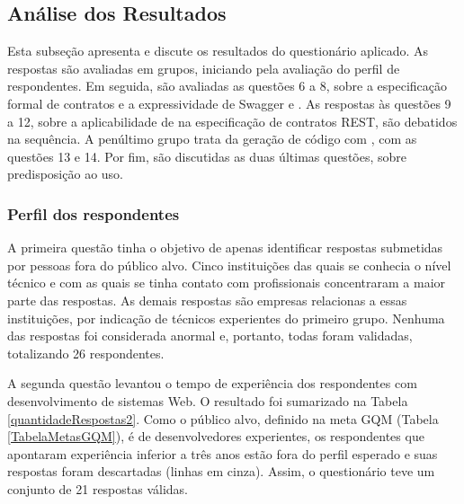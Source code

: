 \subsection{Análise dos Resultados}
\label{AnaliseQuestionario}
\vspace{-6mm}

Esta subseção apresenta e discute os resultados do questionário aplicado. As
respostas são avaliadas em grupos, iniciando pela avaliação do perfil de
respondentes. Em seguida, são avaliadas as questões 6 a 8, sobre a especificação
formal de contratos e a expressividade de Swagger e \neoidl{}. As respostas às
questões 9 a 12, sobre a aplicabilidade de \designbycontract{} na especificação
 de contratos REST, são debatidos na sequência. A penúltimo grupo trata da
 geração de código com \designbycontract{}, com as questões 13 e 14. Por fim,
 são discutidas as duas últimas questões, sobre predisposição ao uso.

\subsubsection{Perfil dos respondentes}

A primeira questão tinha o objetivo de apenas identificar respostas
submetidas por pessoas fora do público alvo. Cinco instituições das quais se
conhecia o nível técnico e com as quais se tinha contato com profissionais
concentraram a maior parte das respostas. As demais respostas são empresas
relacionas a essas instituições, por indicação de técnicos experientes
do primeiro grupo. Nenhuma das respostas foi considerada anormal e, portanto,
todas foram validadas, totalizando 26 respondentes.

A segunda questão levantou o tempo de experiência dos respondentes com
desenvolvimento de sistemas Web. O resultado foi sumarizado na Tabela
\ref{quantidadeRespostas2}. Como o público alvo, definido na meta GQM (Tabela
\ref{TabelaMetasGQM}), é de desenvolvedores experientes, os respondentes que
apontaram experiência inferior a três anos estão fora do perfil esperado e suas
respostas foram descartadas (linhas em cinza). Assim, o questionário teve um
conjunto de 21 respostas válidas.

